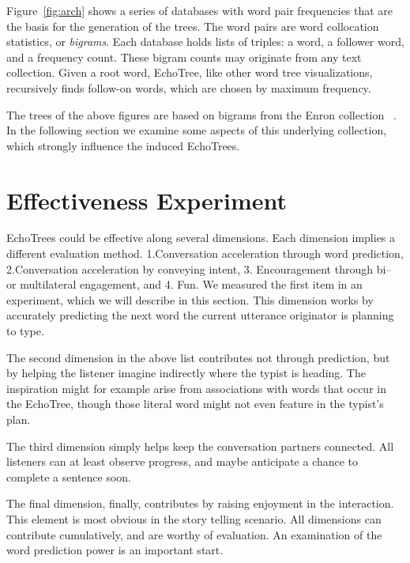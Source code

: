 \documentclass{sigchi}
\newcommand{\squishlist}{
 \begin{list}{$\bullet$}
 {
  \setlength{\itemsep}{0pt}
  \setlength{\parsep}{0pt}   %
  \setlength{\topsep}{0pt}   %
  \setlength{\partopsep}{0pt}
  \setlength{\leftmargin}{1.5em}
  \setlength{\labelwidth}{1em}
  \setlength{\labelsep}{0.5em} } }
\newcommand{\squishend}{
  \end{list}  }
\begin{document}
Figure~\ref{fig:arch} shows a series of databases with word pair
frequencies that are the basis for the generation of the trees. The
word pairs are word collocation statistics, or {\em bigrams}.  Each
database holds lists of triples: a word, a follower word, and a
frequency count. These bigram counts may originate from any text
collection. Given a root word, EchoTree, like other word tree
visualizations, recursively finds follow-on words, which are chosen by
maximum frequency.

The trees of the above figures are based on bigrams from the Enron
collection ~\cite{enron}. In the following section we examine some
aspects of this underlying collection, which strongly influence the
induced EchoTrees.

\section{Effectiveness Experiment}
EchoTrees could be effective along several dimensions. Each dimension
implies a different evaluation method. 1.Conversation acceleration
through word prediction, 2.Conversation acceleration by conveying
intent, 3. Encouragement through bi-- or multilateral engagement, and
4. Fun.
We measured the first item in an experiment, which we will describe in
this section. This dimension works by accurately predicting the next
word the current utterance originator is planning to type.

The second dimension in the above list contributes not through
prediction, but by helping the listener imagine indirectly where the
typist is heading. The inspiration might for example arise from
associations with words that occur in the EchoTree, though those
literal word might not even feature in the typist's plan.

The third dimension simply helps keep the conversation partners
connected. All listeners can at least observe progress, and maybe
anticipate a chance to complete a sentence soon.

The final dimension, finally, contributes by raising enjoyment in the
interaction. This element is most obvious in the story telling
scenario. All dimensions can contribute cumulatively, and are worthy
of evaluation. An examination of the word prediction power is an
important start. 
\end{document}
